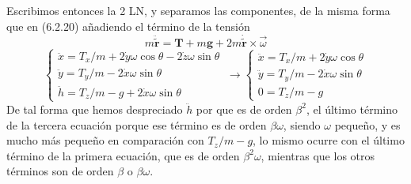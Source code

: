 Escribimos entonces la 2 LN, y separamos las componentes, de la misma forma que en (6.2.20) añadiendo el término de la tensión
\begin{equation} \label{6.1.1}
    m\ddot{\tilde{\mathbf{r}}}= \mathbf{T} + m\mathbf{g} + 2 m \dot{\tilde{\mathbf{r}}} \times  \vec{\omega}
\end{equation} 
\begin{equation} \label{6.1.1}
    \left\{\begin{matrix}
      \ddot{x} = T_x/m +2\dot{y}\omega\cos\theta -2\dot{z}\omega\sin\theta\\
      \ddot{y} = T_y/m -2\dot{x}\omega \sin\theta \phantom{-----,}\\
      \ddot{h} = T_z/m -g + 2\dot{x}\omega \sin\theta \phantom{---,,}
    \end{matrix}\right. \rightarrow
    \left\{\begin{matrix}
        \ddot{x} = T_x/m +2\dot{y}\omega\cos\theta \\
        \ddot{y} = T_y/m -2\dot{x}\omega \sin\theta \phantom{}\\
        0 = T_z/m -g \phantom{---,,}
      \end{matrix}\right.
\end{equation} 
De tal forma que hemos despreciado $\ddot{h}$ por que es de orden $\beta^2$, el último término de la tercera ecuación porque ese término es de orden $\beta \omega$, siendo $\omega$ pequeño, y es mucho más pequeño en comparación con $T_z/m-g$, lo mismo ocurre con el último término de la primera ecuación, que es de orden $\beta^2 \omega$, mientras que los otros términos son de orden $\beta$ o $\beta \omega$. 

